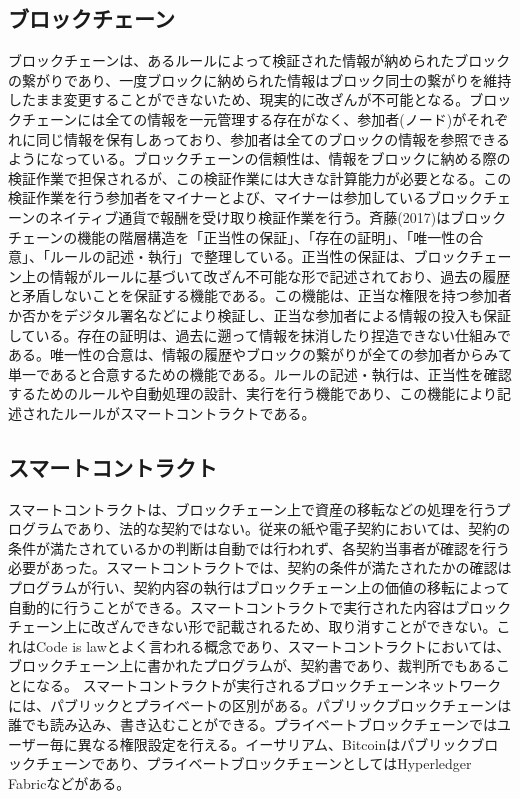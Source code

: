 \documentclass[a4paper,fontsize=11pt,report,notitlepage,line_length=38zw,number_of_lines=40,dvipdfmx]{jlreq}
\begin{document}
\subsection{ブロックチェーン}
ブロックチェーンは、あるルールによって検証された情報が納められたブロックの繋がりであり、一度ブロックに納められた情報はブロック同士の繋がりを維持したまま変更することができないため、現実的に改ざんが不可能となる。ブロックチェーンには全ての情報を一元管理する存在がなく、参加者(ノード)がそれぞれに同じ情報を保有しあっており、参加者は全てのブロックの情報を参照できるようになっている。ブロックチェーンの信頼性は、情報をブロックに納める際の検証作業で担保されるが、この検証作業には大きな計算能力が必要となる。この検証作業を行う参加者をマイナーとよび、マイナーは参加しているブロックチェーンのネイティブ通貨で報酬を受け取り検証作業を行う。斉藤(2017)\cite{saito2017}はブロックチェーンの機能の階層構造を「正当性の保証」、「存在の証明」、「唯一性の合意」、「ルールの記述・執行」で整理している。正当性の保証は、ブロックチェーン上の情報がルールに基づいて改ざん不可能な形で記述されており、過去の履歴と矛盾しないことを保証する機能である。この機能は、正当な権限を持つ参加者か否かをデジタル署名などにより検証し、正当な参加者による情報の投入も保証している。存在の証明は、過去に遡って情報を抹消したり捏造できない仕組みである。唯一性の合意は、情報の履歴やブロックの繋がりが全ての参加者からみて単一であると合意するための機能である。ルールの記述・執行は、正当性を確認するためのルールや自動処理の設計、実行を行う機能であり、この機能により記述されたルールがスマートコントラクトである。

\subsection{スマートコントラクト}
スマートコントラクトは、ブロックチェーン上で資産の移転などの処理を行うプログラムであり、法的な契約ではない。従来の紙や電子契約においては、契約の条件が満たされているかの判断は自動では行われず、各契約当事者が確認を行う必要があった。スマートコントラクトでは、契約の条件が満たされたかの確認はプログラムが行い、契約内容の執行はブロックチェーン上の価値の移転によって自動的に行うことができる。スマートコントラクトで実行された内容はブロックチェーン上に改ざんできない形で記載されるため、取り消すことができない。これはCode is lawとよく言われる概念であり、スマートコントラクトにおいては、ブロックチェーン上に書かれたプログラムが、契約書であり、裁判所でもあることになる\cite{nagasawa2013}。
スマートコントラクトが実行されるブロックチェーンネットワークには、パブリックとプライベートの区別がある。パブリックブロックチェーンは誰でも読み込み、書き込むことができる。プライベートブロックチェーンではユーザー毎に異なる権限設定を行える。イーサリアム、Bitcoinはパブリックブロックチェーンであり、プライベートブロックチェーンとしてはHyperledger Fabricなどがある。
\end{document}
